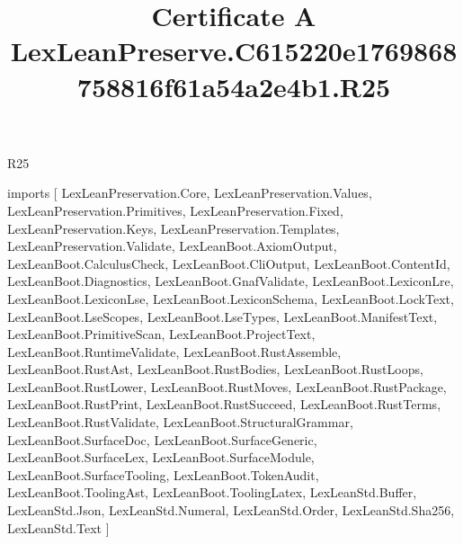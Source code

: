 \begin{lexlean}{R25}
\title{Certificate A LexLeanPreserve.C615220e1769868758816f61a54a2e4b1.R25}
\begin{coremodule}
imports [
  LexLeanPreservation.Core,
  LexLeanPreservation.Values,
  LexLeanPreservation.Primitives,
  LexLeanPreservation.Fixed,
  LexLeanPreservation.Keys,
  LexLeanPreservation.Templates,
  LexLeanPreservation.Validate,
  LexLeanBoot.AxiomOutput,
  LexLeanBoot.CalculusCheck,
  LexLeanBoot.CliOutput,
  LexLeanBoot.ContentId,
  LexLeanBoot.Diagnostics,
  LexLeanBoot.GnafValidate,
  LexLeanBoot.LexiconLre,
  LexLeanBoot.LexiconLse,
  LexLeanBoot.LexiconSchema,
  LexLeanBoot.LockText,
  LexLeanBoot.LseScopes,
  LexLeanBoot.LseTypes,
  LexLeanBoot.ManifestText,
  LexLeanBoot.PrimitiveScan,
  LexLeanBoot.ProjectText,
  LexLeanBoot.RuntimeValidate,
  LexLeanBoot.RustAssemble,
  LexLeanBoot.RustAst,
  LexLeanBoot.RustBodies,
  LexLeanBoot.RustLoops,
  LexLeanBoot.RustLower,
  LexLeanBoot.RustMoves,
  LexLeanBoot.RustPackage,
  LexLeanBoot.RustPrint,
  LexLeanBoot.RustSucceed,
  LexLeanBoot.RustTerms,
  LexLeanBoot.RustValidate,
  LexLeanBoot.StructuralGrammar,
  LexLeanBoot.SurfaceDoc,
  LexLeanBoot.SurfaceGeneric,
  LexLeanBoot.SurfaceLex,
  LexLeanBoot.SurfaceModule,
  LexLeanBoot.SurfaceTooling,
  LexLeanBoot.TokenAudit,
  LexLeanBoot.ToolingAst,
  LexLeanBoot.ToolingLatex,
  LexLeanStd.Buffer,
  LexLeanStd.Json,
  LexLeanStd.Numeral,
  LexLeanStd.Order,
  LexLeanStd.Sha256,
  LexLeanStd.Text
]


\end{coremodule}
\end{lexlean}
